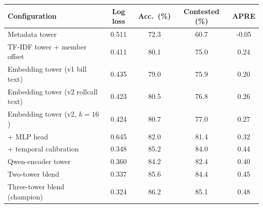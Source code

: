 \begin{tabular}{lcccc}
\toprule
Configuration & Log loss & Acc.\ (\%) & Contested (\%) & APRE \\
\midrule
Metadata tower & 0.511 & 72.3 & 60.7 & -0.05 \\
TF-IDF tower + member offset & 0.411 & 80.1 & 75.0 & 0.24 \\
Embedding tower (v1 bill text) & 0.435 & 79.0 & 75.9 & 0.20 \\
Embedding tower (v2 rollcall text) & 0.423 & 80.5 & 76.8 & 0.26 \\
Embedding tower (v2, $k{=}16$) & 0.424 & 80.7 & 77.0 & 0.27 \\
\quad + MLP head & 0.645 & 82.0 & 81.4 & 0.32 \\
\quad + temporal calibration & 0.348 & 85.2 & 84.0 & 0.44 \\
Qwen-encoder tower & 0.360 & 84.2 & 82.4 & 0.40 \\
Two-tower blend & 0.337 & 85.6 & 84.4 & 0.45 \\
Three-tower blend (champion) & 0.324 & 86.2 & 85.1 & 0.48 \\
\bottomrule
\end{tabular}
